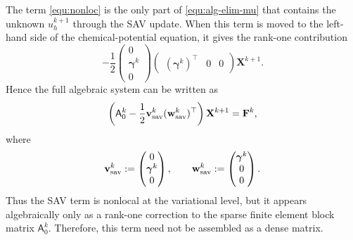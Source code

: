 \documentclass[11pt, reqno]{amsart}
\theoremstyle{definition}
\numberwithin{equation}{section}
\begin{document}
{The term \eqref{equ:nonloc} is the only part of \eqref{equ:alg-elim-mu} that
contains the unknown $u_h^{k+1}$ through the SAV update. When this term is moved
to the left-hand side of the chemical-potential equation, it gives the rank-one
contribution
\[
-\frac12
\begin{pmatrix}
	0\\
	\boldsymbol{\gamma}^k\\
	0
\end{pmatrix}
\begin{pmatrix}
	(\boldsymbol{\gamma}^k)^\top & 0 & 0
\end{pmatrix}
\mathbf X^{k+1}.
\]
Hence the full algebraic system can be written as
\begin{equation}\label{equ:rank-one-sav-system}
	\left(
	\mathsf A_0^k
	-
	\frac12
	\mathbf v_{\rm sav}^k
	(\mathbf w_{\rm sav}^k)^\top
	\right)
	\mathbf X^{k+1}
	=
	\mathbf F^k,
\end{equation}
where
\[
\mathbf v_{\rm sav}^k
:=
\begin{pmatrix}
	0\\
	\boldsymbol{\gamma}^k\\
	0
\end{pmatrix},
\qquad
\mathbf w_{\rm sav}^k
:=
\begin{pmatrix}
	\boldsymbol{\gamma}^k\\
	0\\
	0
\end{pmatrix}.
\]
Thus the SAV term is nonlocal at the variational level, but it appears
algebraically only as a rank-one correction to the sparse finite element block
matrix $\mathsf A_0^k$. Therefore, this term need not be assembled as a dense
matrix.

}
\end{document}
